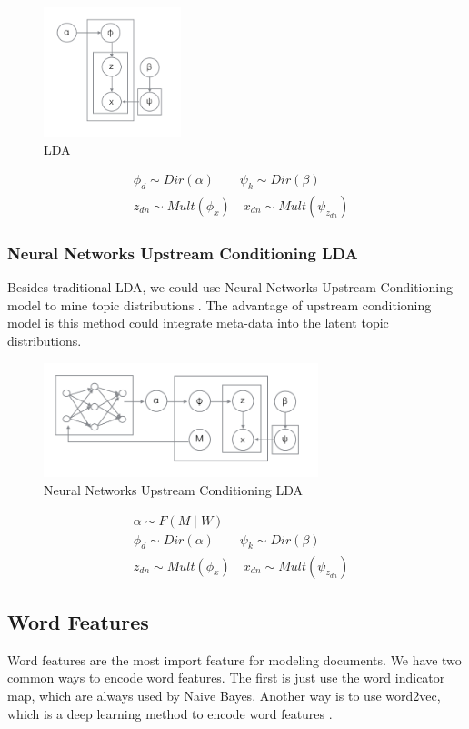 \begin{figure}[!htbp]
    \centering
    \includegraphics[width=4cm]{./pic/LDA.png}
    \caption{LDA}
\end{figure}


\begin{align*}
   & \phi_d \sim Dir (\alpha) \qquad \psi_k \sim Dir (\beta) \\
   & z_{dn} \sim Mult (\phi_x) \quad x_{dn} \sim Mult (\psi_{z_{dn}})
\end{align*}

\subsubsection{Neural Networks Upstream Conditioning LDA}
Besides traditional LDA, we could use Neural Networks Upstream Conditioning model
to mine topic distributions \cite{mimno2012topic}. The advantage of upstream
conditioning model is this method could integrate meta-data into the latent
topic distributions.

\begin{figure}[!htbp]
    \centering
    \includegraphics[width=8cm]{./pic/Up.png}
    \caption{Neural Networks Upstream Conditioning LDA}
\end{figure}

\begin{align*}
   & \alpha \sim F(M \mid W) \\
   & \phi_d \sim Dir (\alpha) \qquad \psi_k \sim Dir (\beta) \\
   & z_{dn} \sim Mult (\phi_x) \quad x_{dn} \sim Mult (\psi_{z_{dn}})
\end{align*}

\subsection{Word Features}
Word features are the most import feature for modeling documents. We have two
common ways to encode word features. The first is just use the word indicator
map, which are always used by Naive Bayes. Another way is to use word2vec, which is
a deep learning method to encode word features \cite{mikolov2013distributed}.

